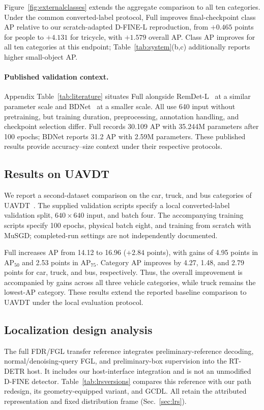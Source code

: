 Figure~\ref{fig:externalclasses} extends the aggregate comparison to all ten categories. Under the common converted-label protocol, Full improves final-checkpoint class AP relative to our scratch-adapted D-FINE-L reproduction, from $+0.465$ points for people to $+4.131$ for tricycle, with $+1.579$ overall AP. Class AP improves for all ten categories at this endpoint; Table~\ref{tab:system}(b,c) additionally reports higher small-object AP.


\paragraph{Published validation context.}
Appendix Table~\ref{tab:literature} situates Full alongside RemDet-L~\cite{li2025remdet} at a similar parameter scale and BDNet~\cite{guan2026bdnet} at a smaller scale. All use 640 input without pretraining, but training duration, preprocessing, annotation handling, and checkpoint selection differ. Full records 30.109 AP with 35.244M parameters after 100 epochs; BDNet reports 31.2 AP with 2.59M parameters. These published results provide accuracy--size context under their respective protocols.



\subsection{Results on UAVDT}\label{sec:uavdt}
We report a second-dataset comparison on the car, truck, and bus categories of UAVDT~\cite{du2018uavdt}. The supplied validation scripts specify a local converted-label validation split, $640\times640$ input, and batch four. The accompanying training scripts specify 100 epochs, physical batch eight, and training from scratch with MuSGD; completed-run settings are not independently documented.


Full increases AP from 14.12 to 16.96 ($+2.84$ points), with gains of 4.95 points in $\mathrm{AP}_{50}$ and 2.53 points in $\mathrm{AP}_{75}$. Category AP improves by 4.27, 1.48, and 2.79 points for car, truck, and bus, respectively. Thus, the overall improvement is accompanied by gains across all three vehicle categories, while truck remains the lowest-AP category. These results extend the reported baseline comparison to UAVDT under the local evaluation protocol.

\subsection{Localization design analysis}
\label{sec:localizationresults}
The full FDR/FGL transfer reference integrates preliminary-reference decoding, normal/denoising-query FGL, and preliminary-box supervision into the RT-DETR host. It includes our host-interface integration and is not an unmodified D-FINE detector. Table~\ref{tab:lrsversions} compares this reference with our path redesign, its geometry-equipped variant, and GCDL. All retain the attributed representation and fixed distribution frame (Sec.~\ref{sec:lrs}).

